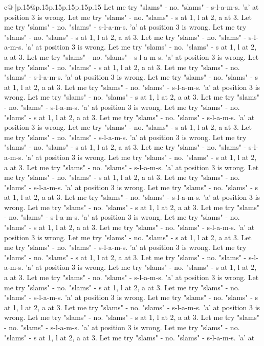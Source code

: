 \documentclass{article}
\begin{document}
{\begin{supertabular}{c@{$\;$}|p{.15\linewidth}@{}p{.15\linewidth}p{.15\linewidth}p{.15\linewidth}p{.15\linewidth}p{.15\linewidth}}
{{{Let me try "slams" {-} no. "slams" {-} s{-}l{-}a{-}m{-}s. 'a' at position 3 is wrong. Let me try "slams" {-} no. "slams" {-} s at 1, l at 2, a at 3. Let me try "slams" {-} no. "slams" {-} s{-}l{-}a{-}m{-}s. 'a' at position 3 is wrong. Let me try "slams" {-} no. "slams" {-} s at 1, l at 2, a at 3. Let me try "slams" {-} no. "slams" {-} s{-}l{-}a{-}m{-}s. 'a' at position 3 is wrong. Let me try "slams" {-} no. "slams" {-} s at 1, l at 2, a at 3. Let me try "slams" {-} no. "slams" {-} s{-}l{-}a{-}m{-}s. 'a' at position 3 is wrong. Let me try "slams" {-} no. "slams" {-} s at 1, l at 2, a at 3. Let me try "slams" {-} no. "slams" {-} s{-}l{-}a{-}m{-}s. 'a' at position 3 is wrong. Let me try "slams" {-} no. "slams" {-} s at 1, l at 2, a at 3. Let me try "slams" {-} no. "slams" {-} s{-}l{-}a{-}m{-}s. 'a' at position 3 is wrong. Let me try "slams" {-} no. "slams" {-} s at 1, l at 2, a at 3. Let me try "slams" {-} no. "slams" {-} s{-}l{-}a{-}m{-}s. 'a' at position 3 is wrong. Let me try "slams" {-} no. "slams" {-} s at 1, l at 2, a at 3. Let me try "slams" {-} no. "slams" {-} s{-}l{-}a{-}m{-}s. 'a' at position 3 is wrong. Let me try "slams" {-} no. "slams" {-} s at 1, l at 2, a at 3. Let me try "slams" {-} no. "slams" {-} s{-}l{-}a{-}m{-}s. 'a' at position 3 is wrong. Let me try "slams" {-} no. "slams" {-} s at 1, l at 2, a at 3. Let me try "slams" {-} no. "slams" {-} s{-}l{-}a{-}m{-}s. 'a' at position 3 is wrong. Let me try "slams" {-} no. "slams" {-} s at 1, l at 2, a at 3. Let me try "slams" {-} no. "slams" {-} s{-}l{-}a{-}m{-}s. 'a' at position 3 is wrong. Let me try "slams" {-} no. "slams" {-} s at 1, l at 2, a at 3. Let me try "slams" {-} no. "slams" {-} s{-}l{-}a{-}m{-}s. 'a' at position 3 is wrong. Let me try "slams" {-} no. "slams" {-} s at 1, l at 2, a at 3. Let me try "slams" {-} no. "slams" {-} s{-}l{-}a{-}m{-}s. 'a' at position 3 is wrong. Let me try "slams" {-} no. "slams" {-} s at 1, l at 2, a at 3. Let me try "slams" {-} no. "slams" {-} s{-}l{-}a{-}m{-}s. 'a' at position 3 is wrong. Let me try "slams" {-} no. "slams" {-} s at 1, l at 2, a at 3. Let me try "slams" {-} no. "slams" {-} s{-}l{-}a{-}m{-}s. 'a' at position 3 is wrong. Let me try "slams" {-} no. "slams" {-} s at 1, l at 2, a at 3. Let me try "slams" {-} no. "slams" {-} s{-}l{-}a{-}m{-}s. 'a' at position 3 is wrong. Let me try "slams" {-} no. "slams" {-} s at 1, l at 2, a at 3. Let me try "slams" {-} no. "slams" {-} s{-}l{-}a{-}m{-}s. 'a' at position 3 is wrong. Let me try "slams" {-} no. "slams" {-} s at 1, l at 2, a at 3. Let me try "slams" {-} no. "slams" {-} s{-}l{-}a{-}m{-}s. 'a' at position 3 is wrong. Let me try "slams" {-} no. "slams" {-} s at 1, l at 2, a at 3. Let me try "slams" {-} no. "slams" {-} s{-}l{-}a{-}m{-}s. 'a' at position 3 is wrong. Let me try "slams" {-} no. "slams" {-} s at 1, l at 2, a at 3. Let me try "slams" {-} no. "slams" {-} s{-}l{-}a{-}m{-}s. 'a' at position 3 is wrong. Let me try "slams" {-} no. "slams" {-} s at 1, l at 2, a at 3. Let me try "slams" {-} no. "slams" {-} s{-}l{-}a{-}m{-}s. 'a' at position 3 is wrong. Let me try "slams" {-} no. "slams" {-} s at 1, l at 2, a at 3. Let me try "slams" {-} no. "slams" {-} s{-}l{-}a{-}m{-}s. 'a' at }}}
\end{supertabular}}
\end{document}
